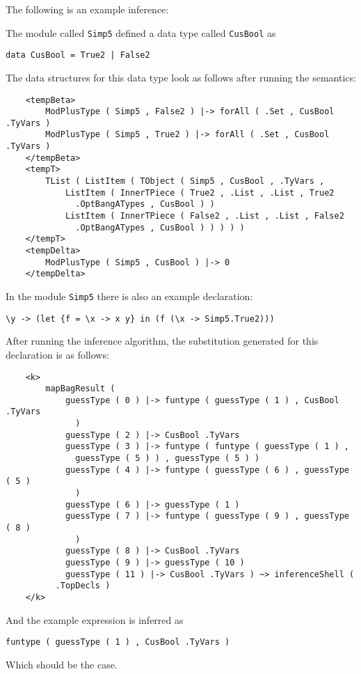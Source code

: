 The following is an example inference:

The module called \texttt{Simp5} defined a data type called \texttt{CusBool} as

\begin{lstlisting}
data CusBool = True2 | False2
\end{lstlisting}

The data structures for this data type look as follows after running the semantics:

\begin{lstlisting}
    <tempBeta>
        ModPlusType ( Simp5 , False2 ) |-> forAll ( .Set , CusBool .TyVars )
        ModPlusType ( Simp5 , True2 ) |-> forAll ( .Set , CusBool .TyVars )
    </tempBeta>
    <tempT>
        TList ( ListItem ( TObject ( Simp5 , CusBool , .TyVars , 
            ListItem ( InnerTPiece ( True2 , .List , .List , True2 
              .OptBangATypes , CusBool ) )
            ListItem ( InnerTPiece ( False2 , .List , .List , False2 
              .OptBangATypes , CusBool ) ) ) ) )
    </tempT>
    <tempDelta>
        ModPlusType ( Simp5 , CusBool ) |-> 0
    </tempDelta>

\end{lstlisting}

In the module \texttt{Simp5} there is also an example declaration:

\begin{lstlisting}
\y -> (let {f = \x -> x y} in (f (\x -> Simp5.True2)))
\end{lstlisting}

After running the inference algorithm, the substitution generated for this declaration is as follows:

\begin{lstlisting}
    <k>
        mapBagResult ( 
            guessType ( 0 ) |-> funtype ( guessType ( 1 ) , CusBool .TyVars 
              )
            guessType ( 2 ) |-> CusBool .TyVars
            guessType ( 3 ) |-> funtype ( funtype ( guessType ( 1 ) , 
              guessType ( 5 ) ) , guessType ( 5 ) )
            guessType ( 4 ) |-> funtype ( guessType ( 6 ) , guessType ( 5 ) 
              )
            guessType ( 6 ) |-> guessType ( 1 )
            guessType ( 7 ) |-> funtype ( guessType ( 9 ) , guessType ( 8 ) 
              )
            guessType ( 8 ) |-> CusBool .TyVars
            guessType ( 9 ) |-> guessType ( 10 )
            guessType ( 11 ) |-> CusBool .TyVars ) ~> inferenceShell ( 
          .TopDecls )
    </k>
\end{lstlisting}

And the example expression is inferred as 

\begin{lstlisting}
funtype ( guessType ( 1 ) , CusBool .TyVars )
\end{lstlisting}

Which should be the case.